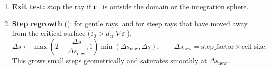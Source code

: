 \begin{enumerate}[itemsep=3pt]
\begin{itemize}[itemsep=1pt]
  \item parabolic switch, if $3(\nabla\varepsilon\cdot\vect v_0)\Delta s/2\le-\varepsilon_0$
        (see \S\ref{sec:parab});
  \item otherwise a Boris step (\S\ref{sec:boris}).
  \end{itemize}
  The segment adds $\kappa B\,\Delta\ell$ (thin) or $B e^{-\tau}(1-e^{-\Delta\tau})$
  (full) to the pixel, with $\kappa$, $B$ evaluated at $\vect r_{1/2}$. If the step
  ends inside $r_\text{body}$ it is clipped at the surface.
\item \textbf{Exit test:} stop the ray if $\mathbf{r}_1$ is outside the domain or the
      integration sphere.
\item \textbf{Step regrowth} (): for gentle rays, and for
      steep rays that have moved away from the critical surface
      ($\varepsilon_0>d_\text{cr}|\nabla\varepsilon|$),
      \[\Delta s\leftarrow\max\!\left(2-\frac{\Delta s}{\Delta s_\text{new}},1\right)
        \min(\Delta s_\text{new},\Delta s),\qquad \Delta s_\text{new}=\text{step\_factor}\times\text{cell size}.\]
      This grows small steps geometrically and saturates smoothly at
      $\Delta s_\text{new}$.
\end{enumerate}

